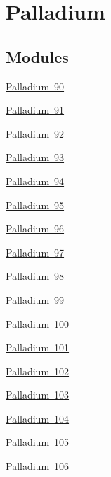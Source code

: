 \hypertarget{group___isotope_const-_palladium}{}\section{Palladium}
\label{group___isotope_const-_palladium}
\subsection*{Modules}
\begin{DoxyCompactItemize}
\item 
\mbox{\hyperlink{group___isotope_const-_palladium-_pd90}{Palladium 90}}
\item 
\mbox{\hyperlink{group___isotope_const-_palladium-_pd91}{Palladium 91}}
\item 
\mbox{\hyperlink{group___isotope_const-_palladium-_pd92}{Palladium 92}}
\item 
\mbox{\hyperlink{group___isotope_const-_palladium-_pd93}{Palladium 93}}
\item 
\mbox{\hyperlink{group___isotope_const-_palladium-_pd94}{Palladium 94}}
\item 
\mbox{\hyperlink{group___isotope_const-_palladium-_pd95}{Palladium 95}}
\item 
\mbox{\hyperlink{group___isotope_const-_palladium-_pd96}{Palladium 96}}
\item 
\mbox{\hyperlink{group___isotope_const-_palladium-_pd97}{Palladium 97}}
\item 
\mbox{\hyperlink{group___isotope_const-_palladium-_pd98}{Palladium 98}}
\item 
\mbox{\hyperlink{group___isotope_const-_palladium-_pd99}{Palladium 99}}
\item 
\mbox{\hyperlink{group___isotope_const-_palladium-_pd100}{Palladium 100}}
\item 
\mbox{\hyperlink{group___isotope_const-_palladium-_pd101}{Palladium 101}}
\item 
\mbox{\hyperlink{group___isotope_const-_palladium-_pd102}{Palladium 102}}
\item 
\mbox{\hyperlink{group___isotope_const-_palladium-_pd103}{Palladium 103}}
\item 
\mbox{\hyperlink{group___isotope_const-_palladium-_pd104}{Palladium 104}}
\item 
\mbox{\hyperlink{group___isotope_const-_palladium-_pd105}{Palladium 105}}
\item 
\mbox{\hyperlink{group___isotope_const-_palladium-_pd106}{Palladium 106}}
\item 

\end{DoxyCompactItemize}
